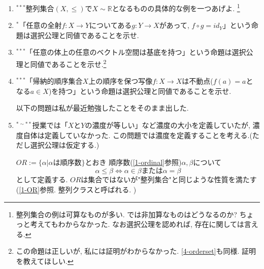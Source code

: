 \documentclass[dvipdfmx,a4paper,11pt]{article}
\newcommand{\R}{\mathbb{R}}
\theoremstyle{definition}
\begin{document}
\begin{enumerate}[label=\textbf{問}\ref*{sec-9}.\arabic*]
囚人たちがこのゲームに勝てる作戦が必ず存在することを示せ. なお選択公理を仮定して良い.%
(ヒント: \ref{4-bin}の同値関係と\ref{5-complete-rep}.)\footnote{実は「囚人は一列に並んでいて, 前の人は後ろの人の帽子の色がわからない」という条件をつけても良い. }


 
   \item $^{***}$整列集合$(X, \le)$で$X \sim \R$となるものの具体的な例を一つあげよ. \footnote{整列集合の例は可算なものが多い. では非加算なものはどうなるのか? ちょっと考えてもわからなかった. なお選択公理を認めれば, 存在に関しては言える. }
   \item $^{*} $「任意の全射$f : X \to Y$についてある$g : Y \to X$があって, $f \circ g = id_Y$」という命題は選択公理と同値であることを示せ.
   \item$^{***}$「任意の体上の任意のベクトル空間は基底を持つ」という命題は選択公理と同値であることを示せ.\footnote{この命題は正しいが, 私には証明がわからなかった. \ref{4-orderset}も同様. 証明を教えてほしい. }
   \item\label{4-orderset}$^{***}$「帰納的順序集合$X$上の順序を保つ写像$f : X \to X$は不動点($f(a)=a$となる$a \in X$)を持つ」という命題は選択公理と同値であることを示せ.
 
  \newpage
以下の問題は私が最近勉強したことをそのまま出した. %
 \item $^{* \sim **}$授業では「$X$と$Y$の濃度が等しい」など濃度の大小を定義していたが, 濃度自体は定義していなかった. 
 この問題では濃度を定義することを考える.(ただし選択公理は仮定する.)
 
 $OR:=\{ \alpha | \text{$\alpha$は順序数}\}$とおき
 順序数(\ref{1-ordinal}参照)$\alpha, \beta$について
 $$
 \alpha \le \beta \Longleftrightarrow 
 \text{$\alpha \in \beta$または$\alpha=\beta$}
 $$
 として定義する. $OR$は集合ではないが"整列集合"と同じような性質を満たす(\ref{1-OR}参照. 整列クラスと呼ばれる. )
 

\end{enumerate}
\end{document}
